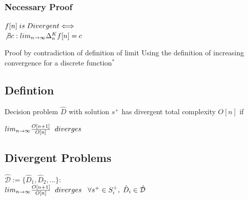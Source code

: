 \documentclass[11pt]{article}
\begin{document}
\subsubsection{Necessary Proof}
\begin{center}
\vspace{2mm}
$
f[n]\hspace{1mm} is \hspace{1mm} Divergent \Longleftrightarrow
$
\\ \vspace{4mm}
$
\not \exists c: lim_{n\rightarrow \infty} \Delta_n^K f[n] = c
$
\end{center}








Proof by contradiction of definition of limit
Using the definition of increasing convergence for a discrete function$^*$




\subsection{Defintion}
Decision problem $\hat{D}$ with solution $s^+$ has divergent total complexity $O[n]$ if
\begin{center}
$
lim_{n \rightarrow \infty} \frac{O[n+1]}{O[n]} \hspace{2mm} diverges
$
\end{center}







\subsection{Divergent Problems}
\begin{center}
$
\mathcal{\hat{D}} := \{ \hat{D}_1,\hat{D}_2,...\} :
$
\\ \vspace{2mm}
$
lim_{n \rightarrow \infty} \frac{O[n+1]}{O[n]} \hspace{2mm} diverges \hspace{3mm} \forall s^+ \in S^+_i, \hspace{1mm} \hat{D}_i \in \hat{\mathcal{D}}
$
\end{center}





\end{document}
